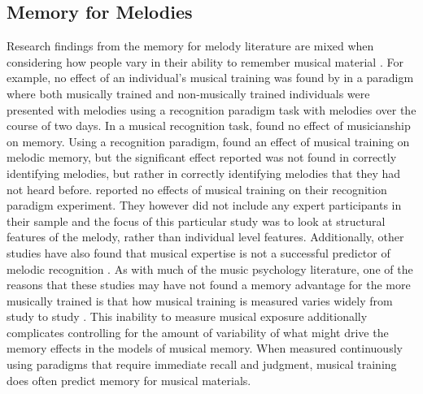 \documentclass[12pt,]{book}
\begin{document}
\hypertarget{memory-for-melodies}{%
\subsection{Memory for Melodies}\label{memory-for-melodies}}

Research findings from the memory for melody literature are mixed when considering how people vary in their ability to remember musical material \citep{halpernMemoryMelodies2010}.
For example, no effect of an individual's musical training was found by \citet{mcauleyPlayItAgain2004} in a paradigm where both musically trained and non-musically trained individuals were presented with melodies using a recognition paradigm task with melodies over the course of two days.
In a musical recognition task, \citet{korenmanRoleFamiliarityEpisodic2004} found no effect of musicianship on memory.
Using a recognition paradigm, \citet{munganLevelsofProcessingEffectsRemember2011} found an effect of musical training on melodic memory, but the significant effect reported was not found in correctly identifying melodies, but rather in correctly identifying melodies that they had not heard before.
\citet{mullensiefenRoleFeaturesContext2014} reported no effects of musical training on their recognition paradigm experiment.
They however did not include any expert participants in their sample and the focus of this particular study was to look at structural features of the melody, rather than individual level features.
Additionally, other studies have also found that musical expertise is not a successful predictor of melodic recognition \citep{demorestLostTranslationEnculturation2008, halpernAgingExperienceRecognition1995}.
As with much of the music psychology literature, one of the reasons that these studies may have not found a memory advantage for the more musically trained is that how musical training is measured varies widely from study to study \citep{talaminiMusiciansHaveBetter2017}.
This inability to measure musical exposure additionally complicates controlling for the amount of variability of what might drive the memory effects in the models of musical memory.
When measured continuously using paradigms that require immediate recall and judgment, musical training does often predict memory for musical materials.
\end{document}
